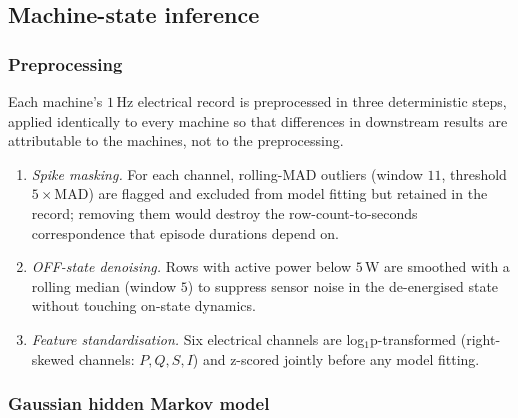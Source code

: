%
%

\subsection{Machine-state inference}
\label{sec:method:labelling}

\subsubsection{Preprocessing}
\label{sec:method:preprocess}

Each machine's $1$\,Hz electrical record is preprocessed in three
deterministic steps, applied identically to every machine so that
differences in downstream results are attributable to the machines,
not to the preprocessing.

\begin{enumerate}
\item \emph{Spike masking.}  For each channel, rolling-MAD outliers
  (window $11$, threshold $5\times$MAD) are flagged and excluded
  from model fitting but retained in the record; removing them would
  destroy the row-count-to-seconds correspondence that episode
  durations depend on.

\item \emph{OFF-state denoising.}  Rows with active power below
  $5$\,W are smoothed with a rolling median (window $5$) to suppress
  sensor noise in the de-energised state without touching on-state
  dynamics.

\item \emph{Feature standardisation.}  Six electrical channels are
  log$_1$p-transformed (right-skewed channels: $P, Q, S, I$) and
  z-scored jointly before any model fitting.
\end{enumerate}

\subsubsection{Gaussian hidden Markov model}
\label{sec:method:ghmm}

